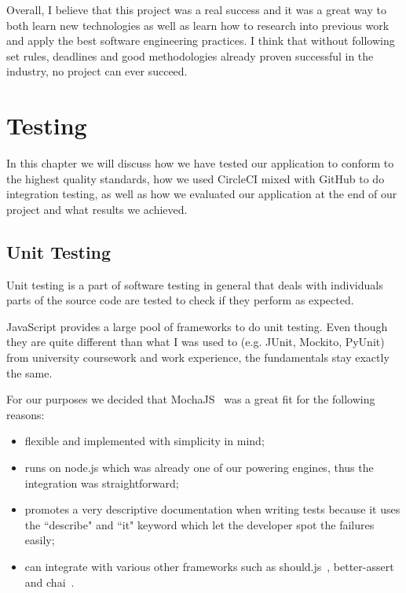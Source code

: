\documentclass{l4proj}
\begin{document}
Overall, I believe that this project was a real success and it was a great way to both learn new technologies as well as
learn how to research into previous work and apply the best software engineering practices. I think that without
following set rules, deadlines and good methodologies already proven successful in the industry, no project can ever
succeed.


\chapter{Testing}
\label{testing}

In this chapter we will discuss how we have tested our application to conform to the highest quality standards, how we used
CircleCI mixed with GitHub to do integration testing, as well as how we evaluated our application at the end of our
project and what results we achieved.

\section{Unit Testing}

Unit testing is a part of software testing in general that deals with individuals parts of the source code are tested
to check if they perform as expected.

JavaScript provides a large pool of frameworks to do unit testing. Even though they are quite different than what I was
used to (e.g. JUnit, Mockito, PyUnit) from university coursework and work experience, the fundamentals stay exactly the
same.

For our purposes we decided that MochaJS~\cite{mocha} was a great fit for the following reasons:

\begin{itemize}
  \item flexible and implemented with simplicity in mind;
  \item runs on node.js which was already one of our powering engines, thus the integration was straightforward;
  \item promotes a very descriptive documentation when writing tests because it uses the ``describe" and ``it" keyword
    which let the developer spot the failures easily;
  \item can integrate with various other frameworks such as should.js~\cite{shouldjs},
    better-assert~\cite{better-assert} and chai~\cite{chai}.
\end{itemize}
\end{document}
